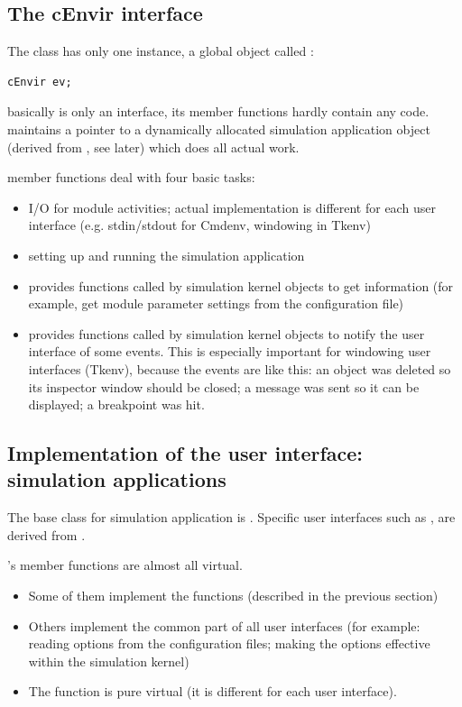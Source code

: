 \subsection{The cEnvir interface}

The  class has only one instance, a global object
called :

\begin{Verbatim}
cEnvir ev;
\end{Verbatim}

 basically is only an interface, its member functions
hardly contain any code.  maintains a pointer to a
dynamically allocated simulation application object (derived from
, see later) which does all actual work.


 member functions deal with four basic tasks:
\begin{itemize}
  \item{I/O for module activities; actual implementation is different
    for each user interface (e.g. stdin/stdout for Cmdenv, windowing
    in Tkenv)}
  \item{setting up and running the simulation application}
  \item{provides functions called by simulation kernel objects to get
    information (for example, get module parameter settings from the
    configuration file)}
  \item{provides functions called by simulation kernel objects to
    notify the user interface of some events. This is especially
    important for windowing user interfaces (Tkenv), because the
    events are like this: an object was deleted so its inspector
    window should be closed; a message was sent so it can be
    displayed; a breakpoint was hit.}
\end{itemize}




\subsection{Implementation of the user interface: simulation applications}

The base class for simulation application is .
Specific user interfaces such as ,
 are derived from .

's member functions are almost all virtual. 
\begin{itemize}
  \item{Some of them implement the  functions
    (described in the previous section)}
  \item{Others implement the common part of all user interfaces (for
    example: reading options from the configuration files; making the
    options effective within the simulation kernel)}
  \item{The  function is pure virtual (it is different
    for each user interface).}
\end{itemize}


